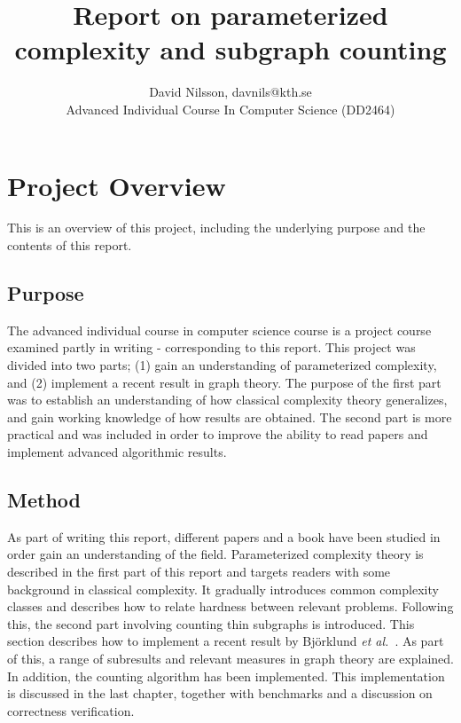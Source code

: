 \documentclass[a4paper,11pt]{report}
\title{Report on parameterized complexity and subgraph counting}
\author{David Nilsson, davnils@kth.se \\ Advanced Individual Course In Computer Science (DD2464)}
\theoremstyle{plain}
\theoremstyle{definition}
\begin{document}

\maketitle
{}

\tableofcontents
\cleardoublepage
{}

\chapter{Project Overview}
This is an overview of this project, including the underlying purpose and the contents of this report.

\section{Purpose}
The advanced individual course in computer science course is a project course examined partly in writing - corresponding to this report.
This project was divided into two parts; (1) gain an understanding of parameterized complexity, and (2) implement a recent result in graph theory.
The purpose of the first part was to establish an understanding of how classical complexity theory generalizes, and gain working knowledge of how results are obtained.
The second part is more practical and was included in order to improve the ability to read papers and implement advanced algorithmic results.

\section{Method}
As part of writing this report, different papers and a book \cite{FG06} have been studied in order gain an understanding of the field.
Parameterized complexity theory is described in the first part of this report and targets readers with some background in classical complexity.
It gradually introduces common complexity classes and describes how to relate hardness between relevant problems.
Following this, the second part involving counting thin subgraphs is introduced.
This section describes how to implement a recent result by Bj\"orklund \emph{et al.}~\cite{BHKK13}.
As part of this, a range of subresults and relevant measures in graph theory are explained.
In addition, the counting algorithm has been implemented.
This implementation is discussed in the last chapter, together with benchmarks and a discussion on correctness verification.
\end{document}
